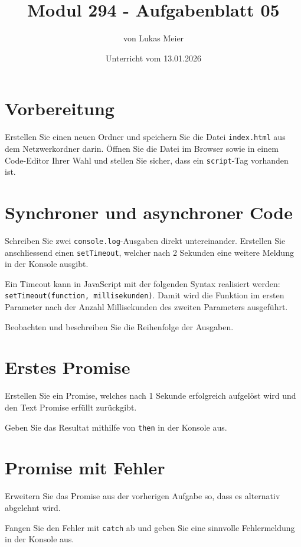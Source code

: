 \documentclass[a4paper,12pt]{article}
\title{Modul 294 - Aufgabenblatt 05}
\author{von Lukas Meier}
\date{Unterricht vom 13.01.2026}
\begin{document}
\maketitle

\section{Vorbereitung}

Erstellen Sie einen neuen Ordner und speichern Sie die Datei \texttt{index.html} aus dem Netzwerkordner darin.  
Öffnen Sie die Datei im Browser sowie in einem Code-Editor Ihrer Wahl und stellen Sie sicher, dass ein \texttt{script}-Tag vorhanden ist.

\section{Synchroner und asynchroner Code}

Schreiben Sie zwei \texttt{console.log}-Ausgaben direkt untereinander.  
Erstellen Sie anschliessend einen \texttt{setTimeout}, welcher nach 2 Sekunden eine weitere Meldung in der Konsole ausgibt. 

Ein Timeout kann in JavaScript mit der folgenden Syntax realisiert werden: \texttt{setTimeout(function, millisekunden)}. Damit wird die Funktion im ersten Parameter nach der Anzahl Millisekunden des zweiten Parameters ausgeführt.

Beobachten und beschreiben Sie die Reihenfolge der Ausgaben.

\section{Erstes Promise}

Erstellen Sie ein Promise, welches nach 1 Sekunde erfolgreich aufgelöst wird und den Text \glqq Promise erfüllt\grqq{} zurückgibt.

Geben Sie das Resultat mithilfe von \texttt{then} in der Konsole aus.

\section{Promise mit Fehler}

Erweitern Sie das Promise aus der vorherigen Aufgabe so, dass es alternativ abgelehnt wird.

Fangen Sie den Fehler mit \texttt{catch} ab und geben Sie eine sinnvolle Fehlermeldung in der Konsole aus.
\end{document}
